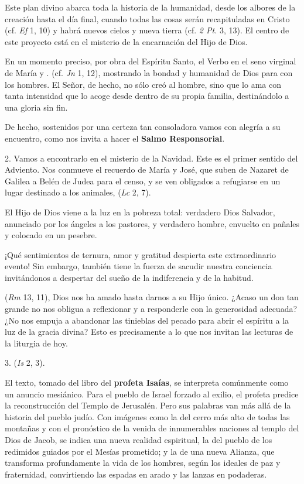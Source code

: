 \begin{body}
\begin{body}
		Este plan divino abarca toda la historia de la humanidad, desde los albores de la creación hasta el día final, cuando todas las cosas serán recapituladas en Cristo (cf. \emph{Ef} 1, 10) y habrá nuevos cielos y nueva tierra (cf. \emph{2 Pt.} 3, 13). El centro de este proyecto está en el misterio de la encarnación del Hijo de Dios.
		
		En un momento preciso, por obra del Espíritu Santo, el Verbo  en el seno virginal de María y . (cf. \emph{Jn} 1, 12), mostrando la bondad y humanidad de Dios para con los hombres. El Señor, de hecho, no sólo creó al hombre, sino que lo ama con tanta intensidad que lo acoge desde dentro de su propia familia, destinándolo a una gloria sin fin.
		
		De hecho, sostenidos por una certeza tan consoladora vamos con alegría a su encuentro, como nos invita a hacer el \textbf{Salmo Responsorial}.
		
		2. Vamos a encontrarlo en el misterio de la Navidad. Este es el primer sentido del Adviento. Nos conmueve el recuerdo de María y José, que suben de Nazaret de Galilea a Belén de Judea para el censo, y se ven obligados a refugiarse en un lugar destinado a los animales,  (\emph{Lc} 2, 7).
		
		El Hijo de Dios viene a la luz en la pobreza total: verdadero Dios Salvador, anunciado por los ángeles a los pastores, y verdadero hombre, envuelto en pañales y colocado en un pesebre.
		
		¡Qué sentimientos de ternura, amor y gratitud despierta este extraordinario evento! Sin embargo, también tiene la fuerza de sacudir nuestra conciencia invitándonos a despertar del sueño de la indiferencia y de la habitud.
		
		 (\emph{Rm} 13, 11), Dios nos ha amado hasta darnos a su Hijo único. ¿Acaso un don tan grande no nos obligua a reflexionar y a responderle con la generosidad adecuada? ¿No nos empuja a abandonar las tinieblas del pecado para abrir el espíritu a la luz de la gracia divina? Esto es precisamente a lo que nos invitan las lecturas de la liturgia de hoy.
		
		3.  (\emph{Is} 2, 3).
		
		El texto, tomado del libro del \textbf{profeta Isaías}, se interpreta comúnmente como un anuncio mesiánico. Para el pueblo de Israel forzado al exilio, el profeta predice la reconstrucción del Templo de Jerusalén. Pero sus palabras van más allá de la historia del pueblo judío. Con imágenes como la del cerro más alto de todas las montañas y con el pronóstico de la venida de innumerables naciones al templo del Dios de Jacob, se indica una nueva realidad espiritual, la del pueblo de los redimidos guiados por el Mesías prometido; y la de una nueva Alianza, que transforma profundamente la vida de los hombres, según los ideales de paz y fraternidad, convirtiendo las espadas en arado y las lanzas en podaderas.
		

\end{body}
\end{body}
